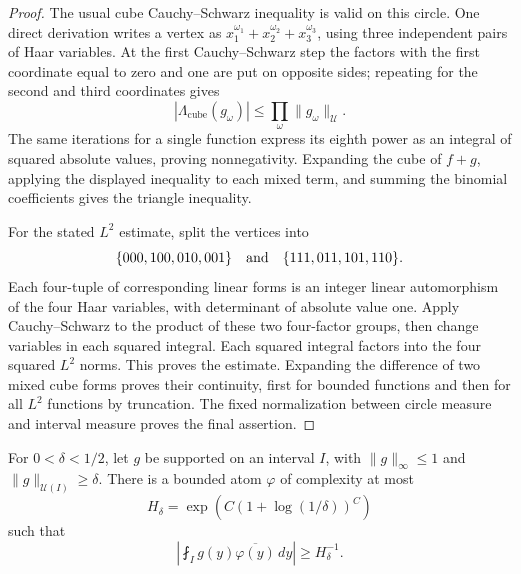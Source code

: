 \begin{proof}
The usual cube Cauchy--Schwarz inequality is valid on this circle.
One direct derivation writes a vertex as
\(x_1^{\omega_1}+x_2^{\omega_2}+x_3^{\omega_3}\), using three
independent pairs of Haar variables.
At the first Cauchy--Schwarz step the factors with the first
coordinate equal to zero and one are put on opposite sides; repeating
for the second and third coordinates gives
\[
 |\Lambda_{\mathrm{cube}}(g_\omega)|
       \le\prod_\omega\|g_\omega\|_{\mathcal U}.
\]
The same iterations for a single function express its eighth power
as an integral of squared absolute values, proving nonnegativity.
Expanding the cube of \(f+g\), applying the displayed inequality to
each mixed term, and summing the binomial coefficients gives the
triangle inequality.

For the stated \(L^2\) estimate, split the vertices into
\[
 \{000,100,010,001\}
       \quad\hbox{and}\quad
 \{111,011,101,110\}.
\]
Each four-tuple of corresponding linear forms is an integer linear
automorphism of the four Haar variables, with determinant of absolute
value one.  Apply Cauchy--Schwarz to the product of these two
four-factor groups, then change variables in each squared integral.
Each squared integral factors into the four squared \(L^2\) norms.
This proves the estimate.  Expanding the difference of two mixed cube
forms proves their continuity, first for bounded functions and then
for all \(L^2\) functions by truncation.  The fixed normalization
between circle measure and interval measure proves the final assertion.
\end{proof}

\begin{lemma}\label{lem:continuous-inverse}
For \(0<\delta<1/2\), let \(g\) be supported on an interval \(I\),
with \(\|g\|_\infty\le1\) and
\(\|g\|_{\mathcal U(I)}\ge\delta\).
There is a bounded atom \(\varphi\) of complexity at most
\[
 H_\delta=\exp\!\left(C(1+\log(1/\delta))^C\right)
\]
such that
\[
 \left|\fint_I g(y)\overline{\varphi(y)}\,dy\right|
       \ge H_\delta^{-1}.
\]
\end{lemma}

